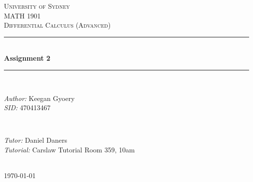 \documentclass[a4paper]{article}
\begin{document}
\begin{titlepage}

\newcommand{\HRule}{\rule{\linewidth}{0.5mm}} %

\center %
 
\textsc{\LARGE University of Sydney}\\[1.5cm] %
\textsc{\Large MATH 1901}\\[0.5cm] %
\textsc{\large Differential Calculus (Advanced)}\\[0.5cm] %

\HRule \\[0.4cm]
{ \huge \bfseries Assignment 2}\\[0.4cm] %
\HRule \\[1.5cm]

\begin{minipage}{0.4\textwidth}
\begin{flushleft} \large
\emph{Author:}
Keegan Gyoery %
\\
\emph{SID:}
470413467
\end{flushleft}
\end{minipage}
~
\begin{minipage}{0.4\textwidth}
\begin{flushright} \large
\emph{Tutor:} 
Daniel Daners %
\\
\emph{Tutorial:}
Carslaw Tutorial Room 359, 10am
\end{flushright}
\end{minipage}\\[4cm]

{\large \today}\\[3cm] %

\vfill %

\end{titlepage}

\end{document}
